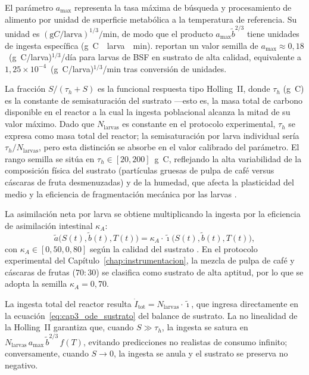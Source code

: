 El parámetro $a_{\max}$ representa la tasa máxima de búsqueda y procesamiento de alimento por unidad de superficie metabólica a la temperatura de referencia. Su unidad es $(\si{\gram C}/\text{larva})^{1/3}/\si{\minute}$, de modo que el producto $a_{\max}\tilde{b}^{2/3}$ tiene unidades de ingesta específica (\si{\gram C \per larva \per \minute}). \textcite{eriksenDynamicModellingFeed2022} reportan un valor semilla de $a_{\max} \approx 0{,}18$~(\si{\gram C}/larva)$^{1/3}$/día para larvas de BSF en sustrato de alta calidad, equivalente a $1{,}25 \times 10^{-4}$~(\si{\gram C}/larva)$^{1/3}$/\si{\minute} tras conversión de unidades.

La fracción $S/(\tau_h + S)$ es la funcional respuesta tipo Holling~II, donde $\tau_h$ (\si{\gram C}) es la constante de semisaturación del sustrato ---esto es, la masa total de carbono disponible en el reactor a la cual la ingesta poblacional alcanza la mitad de su valor máximo. Dado que $N_{\mathrm{larvas}}$ es constante en el protocolo experimental, $\tau_h$ se expresa como masa total del reactor; la semisaturación por larva individual sería $\tau_h/N_{\mathrm{larvas}}$, pero esta distinción se absorbe en el valor calibrado del parámetro. El rango semilla se sitúa en $\tau_h \in [20, 200]$~\si{\gram C}, reflejando la alta variabilidad de la composición física del sustrato (partículas gruesas de pulpa de café versus cáscaras de fruta desmenuzadas) y de la humedad, que afecta la plasticidad del medio y la eficiencia de fragmentación mecánica por las larvas \parencite{bekkerImpactSubstrateMoisture2021a}.

La asimilación neta por larva se obtiene multiplicando la ingesta por la eficiencia de asimilación intestinal $\kappa_A$:
\begin{equation}
    \tilde{a}\bigl(S(t), \tilde{b}(t), T(t)\bigr) = \kappa_A \cdot \tilde{\imath}\bigl(S(t), \tilde{b}(t), T(t)\bigr),
    \label{eq:cap3_asimilacion_neta}
\end{equation}
con $\kappa_A \in [0{,}50, 0{,}80]$ según la calidad del sustrato \parencite{guillaumeAsymptoticEstimatedDigestibility2023}. En el protocolo experimental del Capítulo~\ref{chap:instrumentacion}, la mezcla de pulpa de café y cáscaras de frutas ($70:30$) se clasifica como sustrato de alta aptitud, por lo que se adopta la semilla $\kappa_A = 0{,}70$.

La ingesta total del reactor resulta $\dot{I}_{\mathrm{tot}} = N_{\mathrm{larvas}} \cdot \tilde{\imath}$, que ingresa directamente en la ecuación~\eqref{eq:cap3_ode_sustrato} del balance de sustrato. La no linealidad de la Holling~II garantiza que, cuando $S \gg \tau_h$, la ingesta se satura en $N_{\mathrm{larvas}}\,a_{\max}\,\tilde{b}^{2/3}\,f(T)$, evitando predicciones no realistas de consumo infinito; conversamente, cuando $S \to 0$, la ingesta se anula y el sustrato se preserva no negativo.

